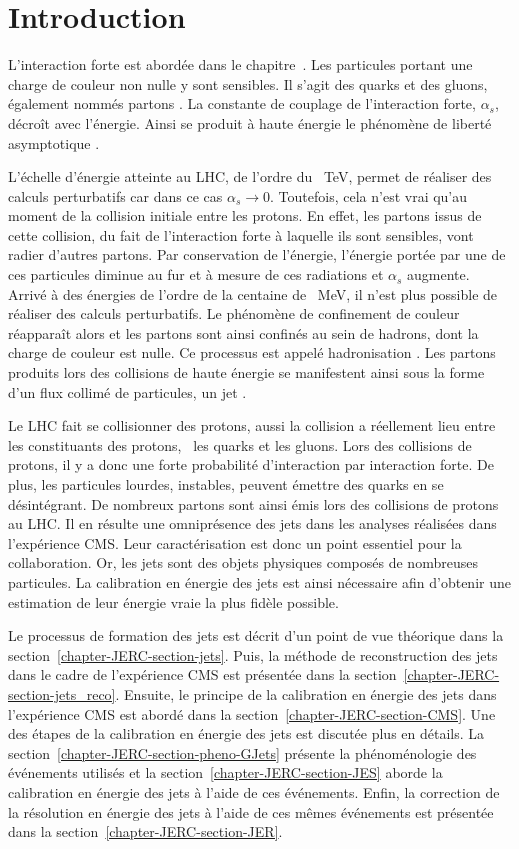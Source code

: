 \section{Introduction}\label{chapter-JERC-section-introduction}
L'interaction forte est abordée dans le chapitre~.
Les particules portant une charge de couleur non nulle y sont sensibles.
Il s'agit des quarks et des gluons, également nommés \og partons \fg.
La constante de couplage de l'interaction forte, $\alpha_s$, décroît  avec l'énergie.
Ainsi se produit à haute énergie le phénomène de \og liberté asymptotique \fg.
\par L'échelle d'énergie atteinte au LHC, de l'ordre du \SI{}{\TeV}, permet de réaliser des calculs perturbatifs car dans ce cas $\alpha_s \to 0$. Toutefois, cela n'est vrai qu'au moment de la collision initiale entre les protons.
En effet, les partons issus de cette collision, du fait de l'interaction forte à laquelle ils sont sensibles, vont radier d'autres partons.
Par conservation de l'énergie, l'énergie portée par une de ces particules diminue au fur et à mesure de ces radiations et $\alpha_s$ augmente.
Arrivé à des énergies de l'ordre de la centaine de \SI{}{\MeV}, il n'est plus possible de réaliser des calculs perturbatifs.
Le phénomène de confinement de couleur réapparaît alors et les partons sont ainsi confinés au sein de hadrons, dont la charge de couleur est nulle.
Ce processus est appelé \og hadronisation \fg.
Les partons produits lors des collisions de haute énergie se manifestent ainsi sous la forme d'un flux collimé de particules, un \og jet \fg.
\par Le LHC fait se collisionner des protons, aussi la collision a réellement lieu entre les constituants des protons, \ie\ les quarks et les gluons.
Lors des collisions de protons, il y a donc une forte probabilité d'interaction par interaction forte.
De plus, les particules lourdes, instables, peuvent émettre des quarks en se désintégrant.
De nombreux partons sont ainsi émis lors des collisions de protons au LHC.
Il en résulte une omniprésence des jets dans les analyses réalisées dans l'expérience CMS.
Leur caractérisation est donc un point essentiel pour la collaboration.
Or, les jets sont des objets physiques composés de nombreuses particules.
La calibration en énergie des jets est ainsi nécessaire afin d'obtenir une estimation de leur énergie \og vraie \fg{} la plus fidèle possible.
\par Le processus de formation des jets est décrit d'un point de vue théorique dans la section~\ref{chapter-JERC-section-jets}.
Puis, la méthode de reconstruction des jets dans le cadre de l'expérience CMS est présentée dans la section~\ref{chapter-JERC-section-jets_reco}.
Ensuite, le principe de la calibration en énergie des jets dans l'expérience CMS est abordé dans la section~\ref{chapter-JERC-section-CMS}.
Une des étapes de la calibration en énergie des jets est discutée plus en détails.
La section~\ref{chapter-JERC-section-pheno-GJets} présente la phénoménologie des événements utilisés et la section~\ref{chapter-JERC-section-JES} aborde la calibration en énergie des jets à l'aide de ces événements.
Enfin, la correction de la résolution en énergie des jets à l'aide de ces mêmes événements est présentée dans la section~\ref{chapter-JERC-section-JER}.